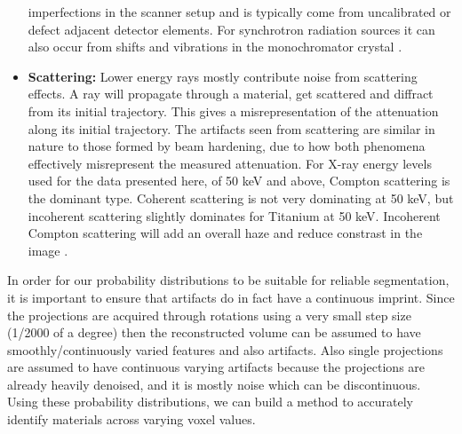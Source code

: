 \begin{itemize}
	imperfections in the scanner setup and is typically come from
	uncalibrated or defect adjacent detector elements. For
	synchrotron radiation sources it can also occur from shifts and
	vibrations in the monochromator crystal \citep{ringartefacts}.
  \item \textbf{Scattering:} Lower energy rays mostly contribute noise
 	from scattering effects. A ray will propagate through a material, get
 	scattered and diffract from its initial trajectory. This gives a
 	misrepresentation of the attenuation along its initial trajectory. The
 	artifacts seen from scattering are similar in nature to those formed by
 	beam hardening, due to how both phenomena effectively misrepresent the
 	measured attenuation. For X-ray energy levels used for the data presented
 	here, of 50 keV and above, Compton scattering is the dominant type.
 	Coherent scattering is not very dominating at 50 keV, but
 	incoherent scattering slightly dominates for Titanium at 50
 	keV. Incoherent Compton scattering will add an overall haze and
	reduce constrast in the image
	\citep{Compton}\citep{xray-attenuation-10-kev-100-mev}\citep{attenuation-cross-sections}.
\end{itemize}

In order for our probability distributions to be suitable for reliable
segmentation,  it is important to ensure that artifacts do in fact have a
continuous imprint.  Since the projections are acquired through rotations using
a very small step size (1/2000 of a degree) then the reconstructed volume can
be assumed to have smoothly/continuously varied features and also artifacts.
Also single projections are assumed to have continuous varying artifacts
because the projections are already heavily denoised, and it is mostly noise
which can be discontinuous. Using these probability distributions, we can build
a method to accurately identify materials across varying voxel values.


